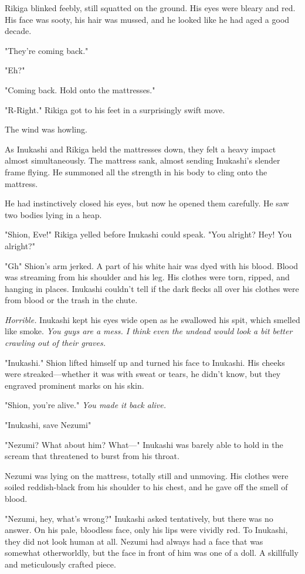 Rikiga blinked feebly, still squatted on the ground. His eyes were
bleary and red. His face was sooty, his hair was mussed, and he looked
like he had aged a good decade.

"They're coming back."

"Eh?"

"Coming back. Hold onto the mattresses."

"R-Right." Rikiga got to his feet in a surprisingly swift move.

The wind was howling.

As Inukashi and Rikiga held the mattresses down, they felt a heavy
impact almost simultaneously. The mattress sank, almost sending
Inukashi's slender frame flying. He summoned all the strength in his
body to cling onto the mattress.

He had instinctively closed his eyes, but now he opened them carefully.
He saw two bodies lying in a heap.

"Shion, Eve!" Rikiga yelled before Inukashi could speak. "You alright?
Hey! You alright?"

"Gh\el " Shion's arm jerked. A part of his white hair was dyed with his
blood. Blood was streaming from his shoulder and his leg. His clothes
were torn, ripped, and hanging in places. Inukashi couldn't tell if the
dark flecks all over his clothes were from blood or the trash in the
chute.

\emph{Horrible.} Inukashi kept his eyes wide open as he swallowed his spit,
which smelled like smoke. \emph{You guys are a mess. I think even the undead
would look a bit better crawling out of their graves.}

"\el Inukashi." Shion lifted himself up and turned his face to Inukashi.
His cheeks were streaked---whether it was with sweat or tears, he didn't
know, but they engraved prominent marks on his skin.

"Shion, you're alive." \emph{You made it back alive.}

"Inukashi, save Nezumi\el "

"Nezumi? What about him? What---" Inukashi was barely able to hold in the
scream that threatened to burst from his throat.

Nezumi was lying on the mattress, totally still and unmoving. His
clothes were soiled reddish-black from his shoulder to his chest, and he
gave off the smell of blood.

"Nezumi, hey, what's wrong?" Inukashi asked tentatively, but there was
no answer. On his pale, bloodless face, only his lips were vividly red.
To Inukashi, they did not look human at all. Nezumi had always had a
face that was somewhat otherworldly, but the face in front of him was
one of a doll. A skillfully and meticulously crafted piece.

